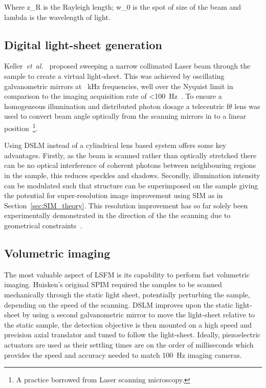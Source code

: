 Where \gls{z_R} is the \gls{Rayleigh length}; \gls{w_0} is the spot of size of the beam and \gls{lambda} is the wavelength of light.


\subsection{Digital \gls{light-sheet} generation}

Keller~\emph{et~al.}~\cite{keller_quantitative_2008} proposed sweeping a narrow collimated \gls{Laser} beam through the sample to create a \gls{virtual light-sheet}.
This was achieved by oscillating galvanometric mirrors at \SI{}{\kilo\hertz} frequencies, well over the Nyquist limit in comparison to the imaging acquisition rate of \SI{<100}{\hertz}~\cite{keller_quantitative_2008}.
To ensure a homogeneous illumination and distributed photon dosage a \gls{telecentric} f\(\theta \) lens was used to convert beam angle optically from the scanning mirrors in to a linear position~\footnote{A practice borrowed from \gls{Laser} scanning microscopy.}.

Using \gls{DSLM} instead of a cylindrical lens based system offers some key advantages.
Firstly, as the beam is scanned rather than optically stretched there can be no optical interference of coherent photons between neighbouring regions in the sample, this reduces speckles and shadows.
Secondly, illumination intensity can be modulated such that structure can be superimposed on the sample giving the potential for \gls{super-resolution} image improvement using \gls{SIM} as in Section~\ref{sec:SIM_theory}.
This resolution improvement has so far solely been experimentally demonstrated in the direction of the the scanning due to geometrical constraints~\cite{chen_lattice_2014}.

\subsection{Volumetric imaging}

The most valuable aspect of \gls{LSFM} is its capability to perform fast volumetric imaging.
Huisken's original \gls{SPIM} required the samples to be scanned mechanically through the static light sheet, potentially perturbing the sample, depending on the speed of the scanning.
\gls{DSLM} improves upon the static \gls{light-sheet} by using a second galvanometric mirror to move the \gls{light-sheet} relative to the static sample, the detection objective is then mounted on a high speed and precision axial translator and tuned to follow the \gls{light-sheet}.
Ideally, piezoelectric actuators are used as their settling times are on the order of milliseconds which provides the speed and accuracy needed to match \SI{100}{\hertz} imaging cameras.

